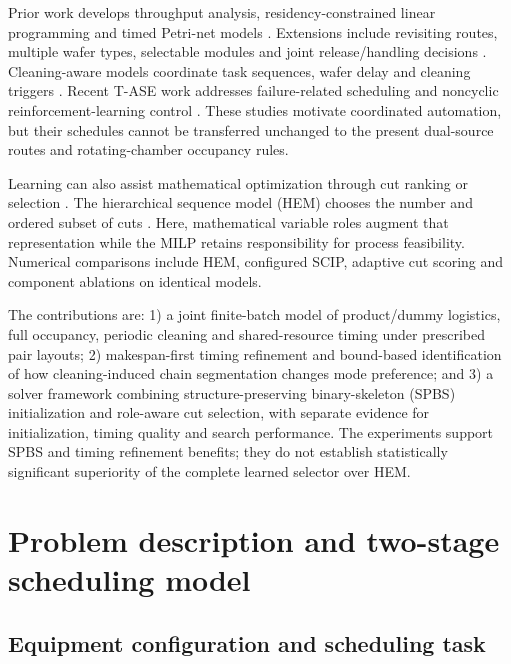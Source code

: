 \documentclass[journal]{IEEEtran}
\begin{document}
Prior work develops throughput analysis, residency-constrained linear programming and timed Petri-net models \cite{perkinson1994throughput,rostami2002optimal,wu2010closedform,qiao2012sojourn}. Extensions include revisiting routes, multiple wafer types, selectable modules and joint release/handling decisions \cite{qiao2014revisiting,wang2020multiple,wang2025virtualcell,yang2025miptwowafers}. Cleaning-aware models coordinate task sequences, wafer delay and cleaning triggers \cite{kim2013cleaning,yu2020delay,qiao2022binary,li2022conditioncleaning}. Recent T-ASE work addresses failure-related scheduling and noncyclic reinforcement-learning control \cite{zhu2025failuredeadlock,kim2025noncyclicdeadlock,kim2025adaptivecluster}. These studies motivate coordinated automation, but their schedules cannot be transferred unchanged to the present dual-source routes and rotating-chamber occupancy rules.

Learning can also assist mathematical optimization through cut ranking or selection \cite{tang2020cut,huang2022cutranking,paulus2022looking}. The hierarchical sequence model (HEM) chooses the number and ordered subset of cuts \cite{wang2023hem}. Here, mathematical variable roles augment that representation while the MILP retains responsibility for process feasibility. Numerical comparisons include HEM, configured SCIP, adaptive cut scoring and component ablations on identical models.

The contributions are: 1) a joint finite-batch model of product/dummy logistics, full occupancy, periodic cleaning and shared-resource timing under prescribed pair layouts; 2) makespan-first timing refinement and bound-based identification of how cleaning-induced chain segmentation changes mode preference; and 3) a solver framework combining structure-preserving binary-skeleton (SPBS) initialization and role-aware cut selection, with separate evidence for initialization, timing quality and search performance. The experiments support SPBS and timing refinement benefits; they do not establish statistically significant superiority of the complete learned selector over HEM.

\section{Problem description and two-stage scheduling model}


\subsection{Equipment configuration and scheduling task}
\end{document}
